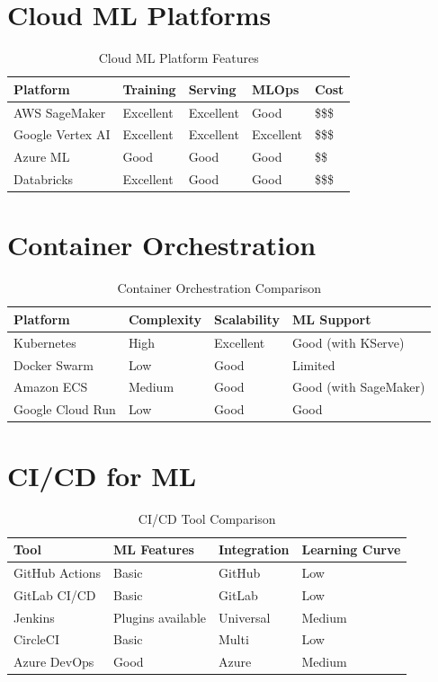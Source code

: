 \section{Cloud ML Platforms}

\begin{table}[h]
\centering
\caption{Cloud ML Platform Features}
\begin{tabular}{@{}lllll@{}}
\toprule
\textbf{Platform} & \textbf{Training} & \textbf{Serving} & \textbf{MLOps} & \textbf{Cost} \\
\midrule
AWS SageMaker & Excellent & Excellent & Good & \$\$\$ \\
Google Vertex AI & Excellent & Excellent & Excellent & \$\$\$ \\
Azure ML & Good & Good & Good & \$\$ \\
Databricks & Excellent & Good & Good & \$\$\$ \\
\bottomrule
\end{tabular}
\end{table}

\section{Container Orchestration}

\begin{table}[h]
\centering
\caption{Container Orchestration Comparison}
\begin{tabular}{@{}llll@{}}
\toprule
\textbf{Platform} & \textbf{Complexity} & \textbf{Scalability} & \textbf{ML Support} \\
\midrule
Kubernetes & High & Excellent & Good (with KServe) \\
Docker Swarm & Low & Good & Limited \\
Amazon ECS & Medium & Good & Good (with SageMaker) \\
Google Cloud Run & Low & Good & Good \\
\bottomrule
\end{tabular}
\end{table}

\section{CI/CD for ML}

\begin{table}[h]
\centering
\caption{CI/CD Tool Comparison}
\begin{tabular}{@{}llll@{}}
\toprule
\textbf{Tool} & \textbf{ML Features} & \textbf{Integration} & \textbf{Learning Curve} \\
\midrule
GitHub Actions & Basic & GitHub & Low \\
GitLab CI/CD & Basic & GitLab & Low \\
Jenkins & Plugins available & Universal & Medium \\
CircleCI & Basic & Multi & Low \\
Azure DevOps & Good & Azure & Medium \\
\bottomrule
\end{tabular}
\end{table}

